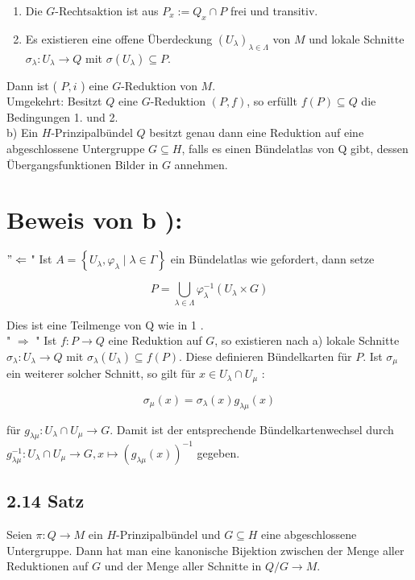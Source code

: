 \documentclass[10pt, letterpaper]{article}
\begin{document}
\begin{enumerate}
  \item Die $G$-Rechtsaktion ist aus $P_{x}:=Q_{x} \cap P$ frei und transitiv.
  \item Es existieren eine offene Überdeckung $\left(U_{\lambda}\right)_{\lambda \in \Lambda}$ von $M$ und lokale Schnitte $\sigma_{\lambda}: U_{\lambda} \rightarrow Q$ mit $\sigma\left(U_{\lambda}\right) \subseteq P$.
\end{enumerate}

Dann ist ( $P, i$ ) eine $G$-Reduktion von $M$.\\
Umgekehrt: Besitzt $Q$ eine $G$-Reduktion $(P, f)$, so erfüllt $f(P) \subseteq Q$ die Bedingungen 1. und 2.\\
b) Ein $H$-Prinzipalbündel $Q$ besitzt genau dann eine Reduktion auf eine abgeschlossene Untergruppe $G \subseteq H$, falls es einen Bündelatlas von Q gibt, dessen Übergangsfunktionen Bilder in $G$ annehmen.

\section*{Beweis von $\mathbf{b}$ ):}
$" \Leftarrow$ " Ist $A=\left\{U_{\lambda}, \varphi_{\lambda} \mid \lambda \in \Gamma\right\}$ ein Bündelatlas wie gefordert, dann setze

$$
P=\bigcup_{\lambda \in \Lambda} \varphi_{\lambda}^{-1}\left(U_{\lambda} \times G\right)
$$

Dies ist eine Teilmenge von Q wie in 1 .\\
" $\Rightarrow$ " Ist $f: P \rightarrow Q$ eine Reduktion auf $G$, so existieren nach a) lokale Schnitte $\sigma_{\lambda}: U_{\lambda} \rightarrow Q$ mit $\sigma_{\lambda}\left(U_{\lambda}\right) \subseteq f(P)$. Diese definieren Bündelkarten für $P$. Ist $\sigma_{\mu}$ ein weiterer solcher Schnitt, so gilt für $x \in U_{\lambda} \cap U_{\mu}$ :

$$
\sigma_{\mu}(x)=\sigma_{\lambda}(x) g_{\lambda \mu}(x)
$$

für $g_{\lambda \mu}: U_{\lambda} \cap U_{\mu} \rightarrow G$. Damit ist der entsprechende Bündelkartenwechsel durch $g_{\lambda \mu}^{-1}: U_{\lambda} \cap U_{\mu} \rightarrow G, x \mapsto\left(g_{\lambda \mu}(x)\right)^{-1}$ gegeben.

\subsection*{2.14 Satz}
Seien $\pi: Q \rightarrow M$ ein $H$-Prinzipalbündel und $G \subseteq H$ eine abgeschlossene Untergruppe. Dann hat man eine kanonische Bijektion zwischen der Menge aller Reduktionen auf $G$ und der Menge aller Schnitte in $Q / G \rightarrow M$.
\end{document}
